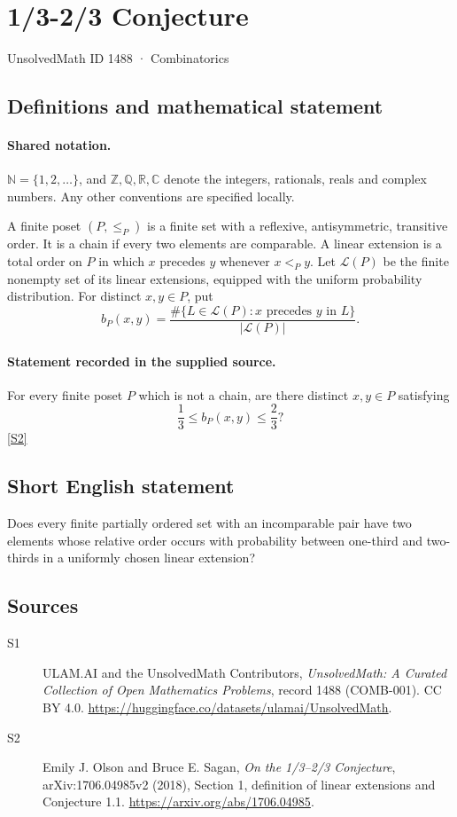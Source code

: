 \documentclass[11pt]{article}
\newcommand{\sref}[2]{\hyperlink{source:#1:#2}{[S#2]}}
\begin{document}
\setcounter{section}{1487}
\section{1/3-2/3 Conjecture}\label{1488}
{\small\sffamily UnsolvedMath ID 1488 · Combinatorics}
\subsection{Definitions and mathematical statement}

\paragraph{Shared notation.}$\mathbb N=\{1,2,\ldots\}$, and $\mathbb Z,\mathbb Q,\mathbb R,\mathbb C$ denote the integers, rationals, reals and complex numbers. Any other conventions are specified locally.


A finite poset \((P,\le_P)\) is a finite set with a reflexive,
antisymmetric, transitive order. It is a chain if every two elements
are comparable. A linear extension is a total order on \(P\) in
which \(x\) precedes \(y\) whenever \(x<_P y\).
Let \(\mathcal L(P)\) be the finite nonempty set of its linear
extensions, equipped with the uniform probability distribution.
For distinct \(x,y\in P\), put
\[
 b_P(x,y)=\frac{\#\{L\in\mathcal L(P):x\text{ precedes }y\text{ in }L\}}
                  {|\mathcal L(P)|}.
\]
\paragraph{Statement recorded in the supplied source.}
For every finite poset \(P\) which is not a chain, are there
distinct \(x,y\in P\) satisfying
\[
                 \frac13\le b_P(x,y)\le\frac23?
\] \sref{1488}{2}
\subsection{Short English statement}
Does every finite partially ordered set with an incomparable pair have two elements whose relative order occurs with probability between one-third and two-thirds in a uniformly chosen linear extension?
\subsection{Sources}
\begin{description}
\item[\hypertarget{source:1488:1}{S1}] ULAM.AI and the UnsolvedMath Contributors, \emph{UnsolvedMath: A Curated Collection of Open Mathematics Problems}, record 1488 (COMB-001). CC BY 4.0. \url{https://huggingface.co/datasets/ulamai/UnsolvedMath}.
\item[\hypertarget{source:1488:2}{S2}] Emily J. Olson and Bruce E. Sagan, \emph{On the 1/3--2/3 Conjecture}, arXiv:1706.04985v2 (2018), Section 1, definition of linear extensions and Conjecture 1.1. \url{https://arxiv.org/abs/1706.04985}.
\end{description}
\label{end:1488}
\end{document}
